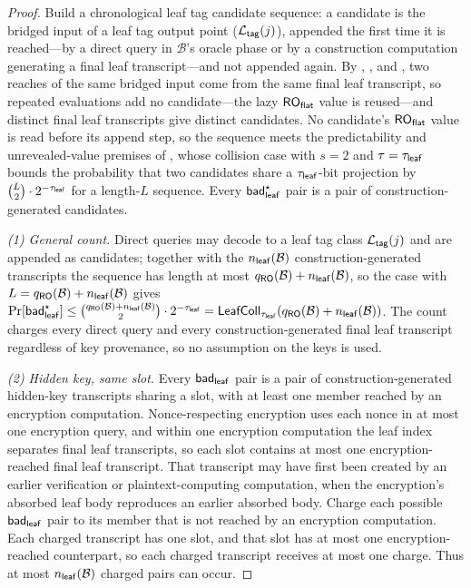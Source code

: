 \begin{proof}
Build a chronological leaf tag candidate sequence: a candidate is the
bridged input of a leaf tag output point ($\mathcal{L}_{\mathsf{tag}}(j)$), appended the first
time it is reached---by a direct query in $\mathcal{B}$'s oracle phase or
by a construction computation generating a final leaf transcript---and
not appended again. By , ,
and , two reaches of the same bridged input come
from the same final leaf transcript, so repeated evaluations add no
candidate---the lazy $\mathsf{RO}_{\mathsf{flat}}$ value is reused---and distinct final leaf
transcripts give distinct candidates. No candidate's $\mathsf{RO}_{\mathsf{flat}}$ value is
read before its append step, so the sequence meets the predictability and
unrevealed-value premises of , whose
collision case with $s = 2$ and $\tau = \tau_{\mathsf{leaf}}$ bounds the probability
that two candidates share a $\tau_{\mathsf{leaf}}$-bit projection by
$\binom{L}{2} \cdot 2^{-\tau_{\mathsf{leaf}}}$ for a length-$L$ sequence. Every
$\mathsf{bad}_{\mathsf{leaf}}^\star$ pair is a pair of construction-generated candidates.

\emph{(1) General count.} Direct queries may decode to a leaf
tag class $\mathcal{L}_{\mathsf{tag}}(j)$ and are appended as candidates; together with the
$n_{\mathsf{leaf}}(\mathcal{B})$ construction-generated transcripts the sequence has
length at most $q_{\mathsf{RO}}(\mathcal{B}) + n_{\mathsf{leaf}}(\mathcal{B})$, so the case
with $L = q_{\mathsf{RO}}(\mathcal{B}) + n_{\mathsf{leaf}}(\mathcal{B})$ gives
$\Pr[\mathsf{bad}_{\mathsf{leaf}}^\star] \leq
\binom{q_{\mathsf{RO}}(\mathcal{B})+n_{\mathsf{leaf}}(\mathcal{B})}{2} \cdot 2^{-\tau_{\mathsf{leaf}}}
= \mathsf{LeafColl}_{\tau_{\mathsf{leaf}}}(q_{\mathsf{RO}}(\mathcal{B})+n_{\mathsf{leaf}}(\mathcal{B}))$. The
count charges every direct query and every construction-generated final
leaf transcript regardless of key provenance, so no assumption on the
keys is used.

\emph{(2) Hidden key, same slot.} Every $\mathsf{bad}_{\mathsf{leaf}}$ pair is a pair of
construction-generated hidden-key transcripts sharing a slot, with at
least one member reached by an encryption computation. Nonce-respecting
encryption uses each nonce in at most one encryption query, and within
one encryption computation the leaf index separates final leaf
transcripts, so each slot contains at most one encryption-reached final
leaf transcript. That transcript may have first been created by an
earlier verification or plaintext-computing computation, when the
encryption's absorbed leaf body reproduces an earlier absorbed body.
Charge each possible $\mathsf{bad}_{\mathsf{leaf}}$ pair to its member that is not reached by
an encryption computation. Each charged transcript has one slot, and
that slot has at most one encryption-reached counterpart, so each charged
transcript receives at most one charge. Thus at most
$n_{\mathsf{leaf}}(\mathcal{B})$ charged pairs can occur.


\end{proof}
